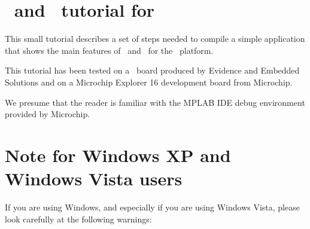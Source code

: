\chapter{\rtd\ and \ee\ tutorial for \dspic}

This small tutorial describes a set of steps needed to compile a
simple application that shows the main features of \ee\ and \rtd\ for
the \dspic\ platform.

This tutorial has been tested on a \flex\ board produced by Evidence
and Embedded Solutions and on a Microchip Explorer 16 development
board from Microchip.

We presume that the reader is familiar with the MPLAB IDE debug environment
provided by Microchip.

%
%





\chapter{Note for Windows XP and Windows Vista users}
\label{ch:vista}

If you are using Windows, and especially if you are using Windows
Vista, please look carefully at the following warnings:

